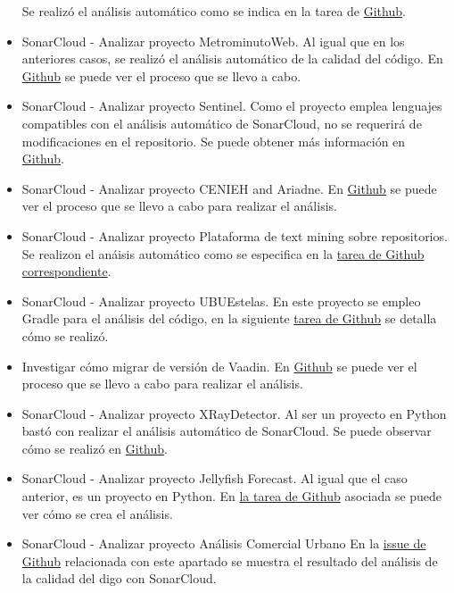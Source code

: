 \begin{itemize}
		Se realizó el análisis automático como se indica en la tarea de \href{https://github.com/dbo1001/Gestor-TFG-2021/issues/80}{Github}.
	\item SonarCloud - Analizar proyecto MetrominutoWeb.
		Al igual que en los anteriores casos, se realizó el análisis automático de la calidad del código. En \href{https://github.com/dbo1001/Gestor-TFG-2021/issues/81}{Github} se puede ver el proceso que se llevo a cabo.
	\item SonarCloud - Analizar proyecto Sentinel.
		Como el proyecto emplea lenguajes compatibles con el análisis automático de SonarCloud, no se requerirá de modificaciones en el repositorio. Se puede obtener más información en \href{https://github.com/dbo1001/Gestor-TFG-2021/issues/82}{Github}.
	\item SonarCloud - Analizar proyecto CENIEH and Ariadne.
		En \href{https://github.com/dbo1001/Gestor-TFG-2021/issues/84}{Github} se puede ver el proceso que se llevo a cabo para realizar el análisis.
	\item SonarCloud - Analizar proyecto Plataforma de text mining sobre repositorios.
		Se realizon el anáisis automático como se especifica en la \href{https://github.com/dbo1001/Gestor-TFG-2021/issues/83}{tarea de Github correspondiente}.
	\item SonarCloud - Analizar proyecto UBUEstelas.	
		En este proyecto se empleo Gradle para el análisis del código, en la siguiente \href{https://github.com/dbo1001/Gestor-TFG-2021/issues/77}{tarea de Github} se detalla cómo se realizó.
	\item Investigar cómo migrar de versión de Vaadin. 
		En \href{https://github.com/dbo1001/Gestor-TFG-2021/issues/70}{Github} se puede ver el proceso que se llevo a cabo para realizar el análisis.
	\item SonarCloud - Analizar proyecto XRayDetector.
		Al ser un proyecto en Python bastó con realizar el análisis automático de SonarCloud. Se puede observar cómo se realizó en \href{https://github.com/dbo1001/Gestor-TFG-2021/issues/90}{Github}.
	\item SonarCloud - Analizar proyecto Jellyfish Forecast.
		Al igual que el caso anterior, es un proyecto en Python. En \href{https://github.com/dbo1001/Gestor-TFG-2021/issues/85}{la tarea de Github} asociada se puede ver cómo se crea el análisis.
	\item SonarCloud - Analizar proyecto Análisis Comercial Urbano
		En la \href{https://github.com/dbo1001/Gestor-TFG-2021/issues/86}{issue de Github} relacionada con este apartado se muestra el resultado del análisis de la calidad del digo con SonarCloud.

\end{itemize}
